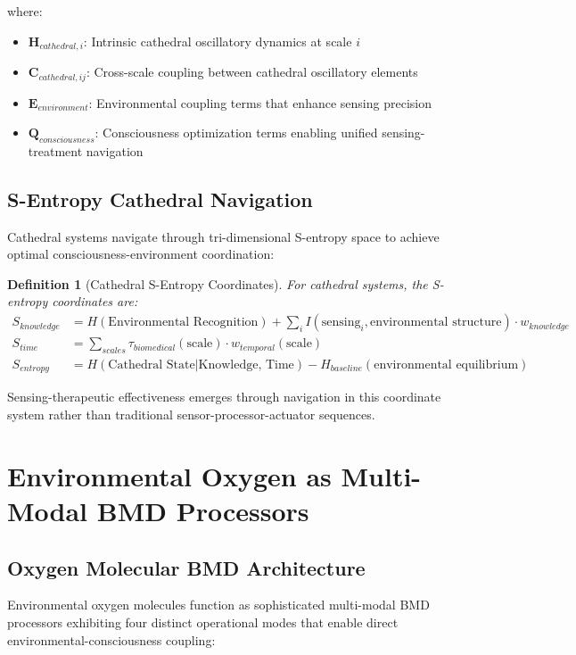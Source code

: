 \documentclass[12pt,a4paper]{article}
\newtheorem{definition}{Definition}
\begin{document}
where:
\begin{itemize}
\item $\mathbf{H}_{cathedral,i}$: Intrinsic cathedral oscillatory dynamics at scale $i$
\item $\mathbf{C}_{cathedral,ij}$: Cross-scale coupling between cathedral oscillatory elements
\item $\mathbf{E}_{environment}$: Environmental coupling terms that enhance sensing precision
\item $\mathbf{Q}_{consciousness}$: Consciousness optimization terms enabling unified sensing-treatment navigation
\end{itemize}

\subsection{S-Entropy Cathedral Navigation}

Cathedral systems navigate through tri-dimensional S-entropy space to achieve optimal consciousness-environment coordination:

\begin{definition}[Cathedral S-Entropy Coordinates]
For cathedral systems, the S-entropy coordinates are:
\begin{align}
S_{knowledge} &= H(\text{Environmental Recognition}) + \sum_i I(\text{sensing}_i, \text{environmental structure}) \cdot w_{knowledge} \\
S_{time} &= \sum_{scales} \tau_{biomedical}(\text{scale}) \cdot w_{temporal}(\text{scale}) \\
S_{entropy} &= H(\text{Cathedral State}|\text{Knowledge, Time}) - H_{baseline}(\text{environmental equilibrium})
\end{align}
\end{definition}

Sensing-therapeutic effectiveness emerges through navigation in this coordinate system rather than traditional sensor-processor-actuator sequences.

\section{Environmental Oxygen as Multi-Modal BMD Processors}

\subsection{Oxygen Molecular BMD Architecture}

Environmental oxygen molecules function as sophisticated multi-modal BMD processors exhibiting four distinct operational modes that enable direct environmental-consciousness coupling:
\end{document}
